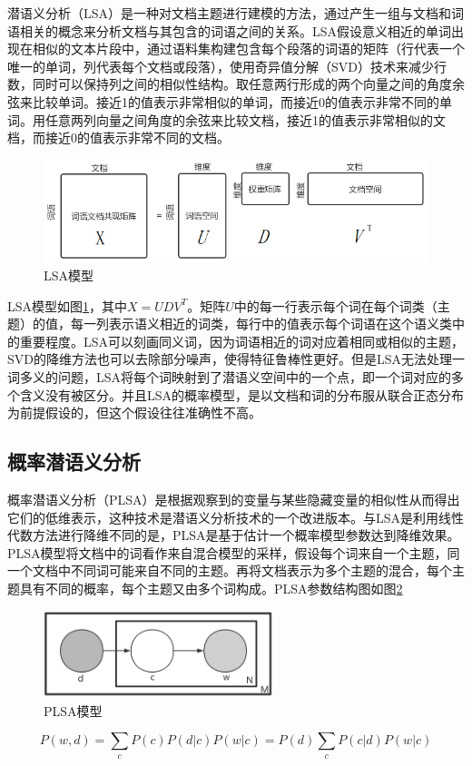 \documentclass[winfonts,master,oneside,nobackinfo]{njuthesis}
\begin{document}
潜语义分析（LSA）是一种对文档主题进行建模的方法，通过产生一组与文档和词语相关的概念来分析文档与其包含的词语之间的关系。LSA假设意义相近的单词出现在相似的文本片段中，通过语料集构建包含每个段落的词语的矩阵（行代表一个唯一的单词，列代表每个文档或段落），使用奇异值分解（SVD）技术来减少行数，同时可以保持列之间的相似性结构。取任意两行形成的两个向量之间的角度余弦来比较单词。接近1的值表示非常相似的单词，而接近0的值表示非常不同的单词。用任意两列向量之间角度的余弦来比较文档，接近1的值表示非常相似的文档，而接近0的值表示非常不同的文档。

\begin{figure}[h]
\centering
\includegraphics[width=1\textwidth]{./figure/LSA.jpg}
\caption{LSA模型}
\label{lsa}
\end{figure}


LSA模型如图\ref{lsa}，其中$X = U D V ^ { T }$。矩阵$U$中的每一行表示每个词在每个词类（主题）的值，每一列表示语义相近的词类，每行中的值表示每个词语在这个语义类中的重要程度。LSA可以刻画同义词，因为词语相近的词对应着相同或相似的主题，SVD的降维方法也可以去除部分噪声，使得特征鲁棒性更好。但是LSA无法处理一词多义的问题，LSA将每个词映射到了潜语义空间中的一个点，即一个词对应的多个含义没有被区分。并且LSA的概率模型，是以文档和词的分布服从联合正态分布为前提假设的，但这个假设往往准确性不高。

\subsection{概率潜语义分析}

概率潜语义分析（PLSA）是根据观察到的变量与某些隐藏变量的相似性从而得出它们的低维表示，这种技术是潜语义分析技术的一个改进版本。与LSA是利用线性代数方法进行降维不同的是，PLSA是基于估计一个概率模型参数达到降维效果。PLSA模型将文档中的词看作来自混合模型的采样，假设每个词来自一个主题，同一个文档中不同词可能来自不同的主题。再将文档表示为多个主题的混合，每个主题具有不同的概率，每个主题又由多个词构成。PLSA参数结构图如图\ref{plsa}

\begin{figure}[h]
\centering
\includegraphics[width=0.6\textwidth]{./figure/PLSA.jpg}
\caption{PLSA模型}
\label{plsa}
\end{figure}
$$P ( w , d ) = \sum _ { c } P ( c ) P ( d | c ) P ( w | c ) = P ( d ) \sum _ { c } P ( c | d ) P ( w | c )$$
\end{document}
